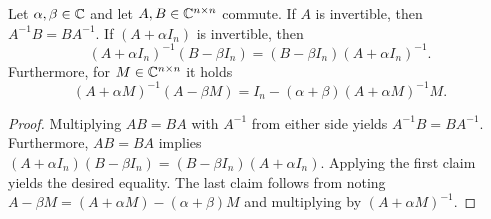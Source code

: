 \begin{lemma}
\label{thm:adi:commuting-matrices}
  Let $\alpha, \beta\in\mathbb{C}$ and let $A, B \in\mathbb{C}^{n\times n}$ commute.
  If $A$ is invertible, then $A^{-1}B = BA^{-1}$.
  If $(A+\alpha I_n)$ is invertible, then
  \begin{equation*}
    (A+\alpha I_n)^{-1} (B-\beta I_n)
    = (B-\beta I_n) (A+\alpha I_n)^{-1}
    .
  \end{equation*}
  Furthermore, for $M\in\mathbb{C}^{n\times n}$ it holds
  \begin{equation*}
    (A+\alpha M)^{-1} (A-\beta M)
    = I_n - (\alpha+\beta) (A+\alpha M)^{-1} M
    .
  \end{equation*}
\end{lemma}
\begin{proof}
  Multiplying $AB=BA$ with $A^{-1}$ from either side yields $A^{-1}B=BA^{-1}$.
  Furthermore, $AB=BA$ implies
  $
    (A+\alpha I_n) (B-\beta I_n)
    =
    (B-\beta I_n) (A+\alpha I_n)
  $.
  Applying the first claim yields the desired equality.
  The last claim follows from noting
  $A-\beta M = (A+\alpha M) - (\alpha+\beta)M$
  and multiplying by $(A+\alpha M)^{-1}$.
\end{proof}

